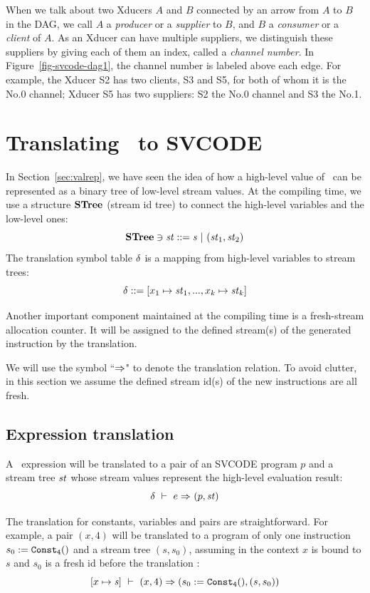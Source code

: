 When we talk about two Xducers $A$ and $B$ connected by an arrow from $A$ to $B$ in the DAG, we call $A$ a \emph{producer} or a \emph{supplier} to $B$, and $B$ a \emph{consumer} or a \emph{client} of $A$. 
As an Xducer can have multiple suppliers, we distinguish these suppliers by giving each of them an index, called a \emph{channel number}. 
In Figure~\ref{fig-svcode-dag1}, the channel number is labeled above each edge. 
For example, the Xducer S2 has two clients, S3 and S5, for both of whom it is the No.0 channel;  Xducer S5 has two suppliers: S2 the No.0 channel and S3 the No.1. \\



\section{Translating \mysnesl \ to SVCODE}
In Section~\ref{sec:valrep}, we have seen the idea of how a high-level value of \mysnesl \ can be represented as a binary tree of low-level stream values.
At the compiling time, we use a structure $\mathbf{STree}$ (stream id tree) to connect the high-level variables and the low-level ones: 
$$ \STree \ni \st ::= \s \ | \ (\st_1,\st_2) $$
The translation symbol table $\delta$ is a mapping from high-level variables to stream trees:
 $$\del ::= [x_1 \|-> \st_1,..., x_k \|-> {\st_k}] $$ 

Another important component maintained at the compiling time is a fresh-stream allocation counter. 
It will be assigned to the defined stream(s) of the generated instruction by the translation.

We will use the symbol ``$\Rightarrow$" to denote the translation relation. 
To avoid clutter, in this section we assume the defined stream id(s) of the new instructions are all fresh.

 
\subsection{Expression translation}


A \mysnesl \ expression will be translated to a pair of an SVCODE program $p$ and a stream tree $\mathit{st}$ whose stream values represent the high-level evaluation result:
$$ \delta \ \vdash\  e \Rightarrow^{}_{} (p,\mathit{st})$$

The translation for constants, variables and pairs are straightforward. For example, a pair $(x,4)$ will be translated to a program of only one instruction $s_0 := \mathtt{Const_{4}()}$ and a stream tree $(s,s_0)$, assuming in the context $x$ is bound to $s$ and $s_0$ is a fresh id before the translation :   
$$[x \|-> \s] \Env (x,4)  \Ra (s_0 := \constaf{4}, (s,s_0))$$ 

